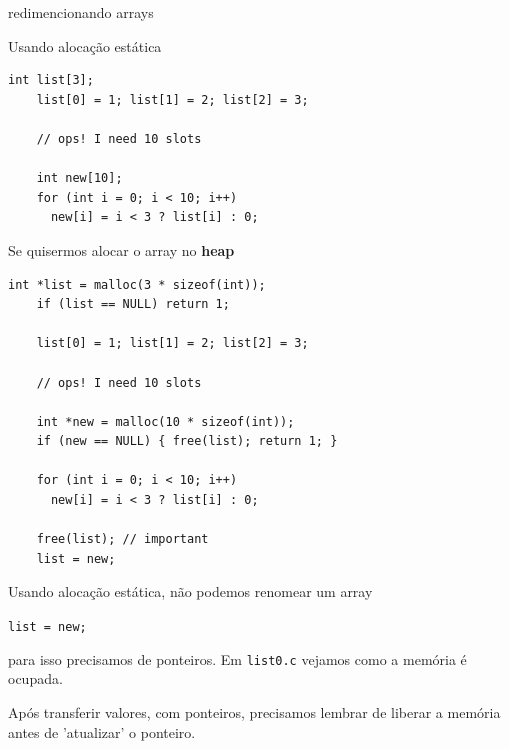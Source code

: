 \documentclass{beamer}
\begin{document}
\begin{frame}{redimencionando arrays}

  Usando alocação estática 

  \begin{lstlisting}[style=normalc,caption=list0.c]
    int list[3];
    list[0] = 1; list[1] = 2; list[2] = 3;
    
    // ops! I need 10 slots
    
    int new[10];
    for (int i = 0; i < 10; i++) 
      new[i] = i < 3 ? list[i] : 0;
  \end{lstlisting}

  \framebreak

  Se quisermos alocar o array no \textbf{heap} 

  \begin{lstlisting}[style=normalc,caption=list1.c]
    int *list = malloc(3 * sizeof(int));
    if (list == NULL) return 1;
    
    list[0] = 1; list[1] = 2; list[2] = 3;

    // ops! I need 10 slots
    
    int *new = malloc(10 * sizeof(int));
    if (new == NULL) { free(list); return 1; }
    
    for (int i = 0; i < 10; i++) 
      new[i] = i < 3 ? list[i] : 0;

    free(list); // important
    list = new;  
  \end{lstlisting}

  \framebreak

  Usando alocação estática, não podemos renomear um array

  {\color{red} \texttt{list = new;}}

  para isso precisamos de ponteiros. Em \texttt{list0.c} vejamos como
  a memória é ocupada.

  Após transferir valores, com ponteiros, precisamos lembrar de
  liberar a memória antes de 'atualizar' o ponteiro.

\end{frame}
\end{document}
